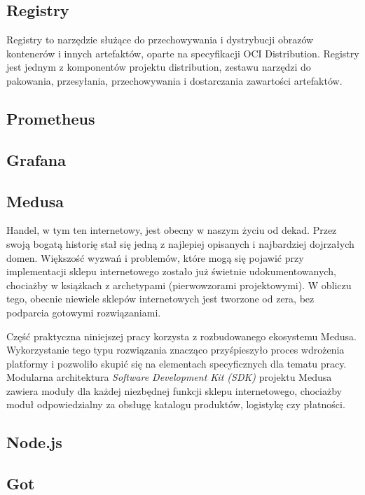 \subsection{Registry}\label{subsec:distribution}

Registry to narzędzie służące do przechowywania i dystrybucji obrazów kontenerów i innych artefaktów, oparte na specyfikacji OCI Distribution\cite{oci-distribution-specification-github}.
Registry jest jednym z komponentów projektu distribution\cite{distribution-github}, zestawu narzędzi do pakowania, przesyłania, przechowywania i dostarczania zawartości artefaktów.


\subsection{Prometheus}\label{subsec:prometheus}


\subsection{Grafana}\label{subsec:grafana}


\subsection{Medusa}\label{subsec:medusa}

Handel, w tym ten internetowy, jest obecny w naszym życiu od dekad.
Przez swoją bogatą historię stał się jedną z najlepiej opisanych i najbardziej dojrzałych domen.
Większość wyzwań i problemów, które mogą się pojawić przy implementacji sklepu internetowego zostało już świetnie udokumentowanych, chociażby w książkach z archetypami (pierwowzorami projektowymi).
W obliczu tego, obecnie niewiele sklepów internetowych jest tworzone od zera, bez podparcia gotowymi rozwiązaniami.

Część praktyczna niniejszej pracy korzysta z rozbudowanego ekosystemu Medusa\cite{medusajs-home}.
Wykorzystanie tego typu rozwiązania znacząco przyśpieszyło proces wdrożenia platformy i pozwoliło skupić się na elementach specyficznych dla tematu pracy.
Modularna architektura \emph{Software Development Kit (SDK)} projektu Medusa zawiera moduły dla każdej niezbędnej funkcji sklepu internetowego, chociażby moduł odpowiedzialny za obsługę katalogu produktów, logistykę czy płatności.

\subsection{Node.js}\label{subsec:node}


\subsection{Got}\label{subsec:got}

